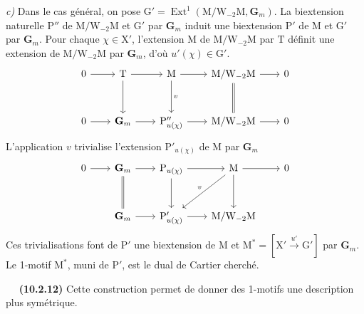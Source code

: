 \documentclass[11pt,leqno]{article}
\newcommand{\Page}[1]{\ifvmode\noindent\else\unskip\ \fi{\footnotesize\textcolor{gray}{[p.\,#1]}}\ \ignorespaces}
\begin{document}
\textit{c)} Dans le cas général, on pose
\(\mathrm{G}'=\operatorname{Ext}^{1}
(\mathrm{M}/\mathrm{W}_{-2}\mathrm{M},\mathbf{G}_m)\).
La biextension naturelle \(\mathrm{P}''\) de
\(\mathrm{M}/\mathrm{W}_{-2}\mathrm{M}\) et \(\mathrm{G}'\)
par \(\mathbf{G}_m\) induit une biextension \(\mathrm{P}'\)
de \(\mathrm{M}\) et \(\mathrm{G}'\) par \(\mathbf{G}_m\).
Pour chaque \(\chi\in\mathrm{X}'\), l’extension \(\mathrm{M}\)
de \(\mathrm{M}/\mathrm{W}_{-2}\mathrm{M}\) par \(\mathrm{T}\)
définit une extension de
\(\mathrm{M}/\mathrm{W}_{-2}\mathrm{M}\) par \(\mathbf{G}_m\),
d’où \(u'(\chi)\in\mathrm{G}'\).
\[
\begin{tikzcd}[row sep=3em, column sep=2em]
0 \arrow[r] &
\mathrm{T} \arrow[r] \arrow[d] &
\mathrm{M} \arrow[r] \arrow[d, "v"] &
\mathrm{M}/\mathrm{W}_{-2}\mathrm{M}
  \arrow[r] \arrow[d, equal] &
0\\
0 \arrow[r] &
\mathbf{G}_m \arrow[r] &
\mathrm{P}''_{u(\chi)} \arrow[r] &
\mathrm{M}/\mathrm{W}_{-2}\mathrm{M} \arrow[r] &
0
\end{tikzcd}
\]
L’application \(v\) trivialise l’extension
\(\mathrm{P}'_{u(\chi)}\) de \(\mathrm{M}\) par \(\mathbf{G}_m\)
\[
\begin{tikzcd}[row sep=3em, column sep=2em]
0 \arrow[r] &
\mathbf{G}_m \arrow[r] \arrow[d, equal] &
\mathrm{P}_{u(\chi)} \arrow[r] \arrow[d] &
\mathrm{M} \arrow[r] \arrow[d] \arrow[dl, "v"'] &
0\\
& \mathbf{G}_m \arrow[r] &
\mathrm{P}'_{u(\chi)} \arrow[r] &
\mathrm{M}/\mathrm{W}_{-2}\mathrm{M} &
\end{tikzcd}
\]
Ces trivialisations font de \(\mathrm{P}'\) une biextension de
\(\mathrm{M}\) et
\(\mathrm{M}^{*}=[\mathrm{X}'\xrightarrow{u'}\mathrm{G}']\)
par \(\mathbf{G}_m\). Le 1-motif \(\mathrm{M}^{*}\), muni de
\(\mathrm{P}'\), est le dual de Cartier cherché.

\Page{68}
\textbf{(10.2.12)} Cette construction permet de donner des
1-motifs une description plus symétrique.
\end{document}
